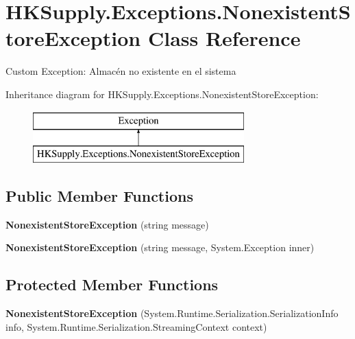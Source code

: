\hypertarget{class_h_k_supply_1_1_exceptions_1_1_nonexistent_store_exception}{}\section{H\+K\+Supply.\+Exceptions.\+Nonexistent\+Store\+Exception Class Reference}
\label{class_h_k_supply_1_1_exceptions_1_1_nonexistent_store_exception}


Custom Exception\+: Almacén no existente en el sistema  


Inheritance diagram for H\+K\+Supply.\+Exceptions.\+Nonexistent\+Store\+Exception\+:\begin{figure}[H]
\begin{center}
\leavevmode
\includegraphics[height=2.000000cm]{class_h_k_supply_1_1_exceptions_1_1_nonexistent_store_exception}
\end{center}
\end{figure}
\subsection*{Public Member Functions}
\begin{DoxyCompactItemize}
\item 
\mbox{\label{class_h_k_supply_1_1_exceptions_1_1_nonexistent_store_exception_a73a0da39b096e932188482518b50766e}} 
{\bfseries Nonexistent\+Store\+Exception} (string message)
\item 
\mbox{\label{class_h_k_supply_1_1_exceptions_1_1_nonexistent_store_exception_a79df07a44db5493bcd945a6f339ca249}} 
{\bfseries Nonexistent\+Store\+Exception} (string message, System.\+Exception inner)
\end{DoxyCompactItemize}
\subsection*{Protected Member Functions}
\begin{DoxyCompactItemize}
\item 
\mbox{\label{class_h_k_supply_1_1_exceptions_1_1_nonexistent_store_exception_a73cce81f48fe6efe065b29cdea1af57b}} 
{\bfseries Nonexistent\+Store\+Exception} (System.\+Runtime.\+Serialization.\+Serialization\+Info info, System.\+Runtime.\+Serialization.\+Streaming\+Context context)
\end{DoxyCompactItemize}


